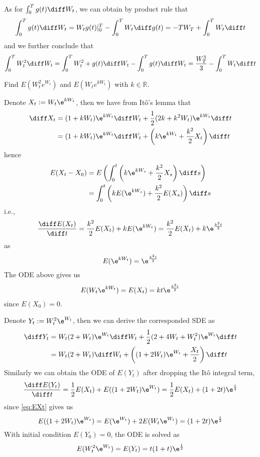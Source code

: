     As for $\int_0^Tg(t)\diff W_t$, we can obtain by product rule that
    \[\int_0^Tg(t)\diff W_t=W_tg(t)|_0^T-\int_0^TW_t\diff g(t)
    =-TW_T+\int_0^TW_t\diff t\]
    and we further conclude that
    \[\int_0^TW_t^2\diff W_t
    =\int_0^TW_t^2+g(t)\diff W_t-\int_0^Tg(t)\diff W_t
    =\frac{W_T^3}{3}-\int_0^TW_t\diff t\]

    \problem
    \begin{question}
        Find $E(W_t^2e^{W_t})$ and $E(W_te^{kW_t})$ with $k\in\mathbb R$.
    \end{question}
    Denote $X_t:=W_t\e^{kW_t}$, then we have from It\^o's lemma that
    \[\begin{aligned}
        \diff X_t&=(1+kW_t)\e^{kW_t}\diff W_t
        +\frac{1}{2}(2k+k^2W_t)\e^{kW_t}\diff t\\
        &=(1+kW_t)\e^{kW_t}\diff W_t+\left(k\e^{kW_t}+\frac{k^2}{2}X_t\right)\diff t
    \end{aligned}\]
    hence
    \[\begin{aligned}
        E(X_t-X_0)&=E\left(\int_0^t\left(k\e^{kW_s}+\frac{k^2}{2}X_s\right)\diff s\right)\\
        &=\int_0^t\left(kE(\e^{kW_s})+\frac{k^2}{2}E(X_s)\right)\diff s
    \end{aligned}\]
    i.e.,
    \[\frac{\diff E(X_t)}{\diff t}=\frac{k^2}{2}E(X_t)+kE(\e^{kW_t})
    =\frac{k^2}{2}E(X_t)+k\e^{\frac{k^2t}{2}}\]
    as
    \[E(\e^{kW_t})=\e^{\frac{k^2t}{2}}\]
    The ODE above gives us
    \begin{equation}
        \label{eq:EXt}
        E(W_t\e^{kW_t})=E(X_t)=kt\e^{\frac{k^2t}{2}}
    \end{equation}
    since $E(X_0)=0$.

    Denote $Y_t:=W_t^2\e^{W_t}$, then we can derive the corresponded SDE as
    \[\begin{aligned}
        \diff Y_t&=W_t(2+W_t)\e^{W_t}\diff W_t+\frac{1}{2}(2+4W_t+W_t^2)\e^{W_t}\diff t\\
        &=W_t(2+W_t)\diff W_t+\left((1+2W_t)\e^{W_t}+\frac{X_t}{2}\right)\diff t
    \end{aligned}\]
    Similarly we can obtain the ODE of $E(Y_t)$ after dropping the It\^o integral term,
    \[\frac{\diff E(Y_t)}{\diff t}=\frac{1}{2}E(X_t)+E((1+2W_t)\e^{W_t})
    =\frac{1}{2}E(X_t)+(1+2t)\e^{\frac{t}{2}}\]
    since \cref{eq:EXt} gives us
    \[E((1+2W_t)\e^{W_t})=E(\e^{W_t})+2E(W_t\e^{W_t})=(1+2t)\e^{\frac{t}{2}}\]
    With initial condition $E(Y_0)=0$, the ODE is solved as
    \[E(W_t^2\e^{W_t})=E(Y_t)=t(1+t)\e^{\frac{t}{2}}\]


